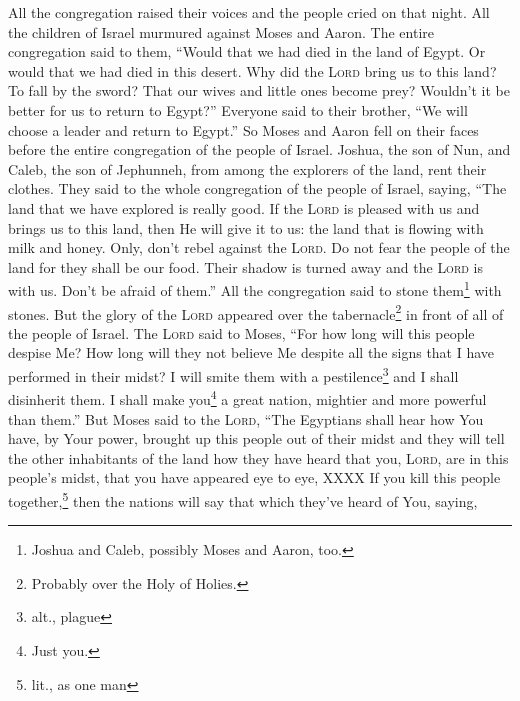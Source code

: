 

\begin{enumerate*}[mode=unboxed]
     All the congregation raised their voices and the people cried on that night.%
     All the children of Israel murmured against Moses and Aaron. The entire congregation said to them, ``Would that we had died in the land of Egypt. Or would that we had died in this desert.%
     Why did the \textsc{Lord} bring us to this land? To fall by the sword? That our wives and little ones become prey? Wouldn't it be better for us to return to Egypt?''%
     Everyone said to their brother, ``We will choose a leader and return to Egypt.''%
     So Moses and Aaron fell on their faces before the entire congregation of the people of Israel.%
     Joshua, the son of Nun, and Caleb, the son of Jephunneh, from among the explorers of the land, rent their clothes.%
     They said to the whole congregation of the people of Israel, saying, ``The land that we have explored is really good.%
     If the \textsc{Lord} is pleased with us and brings us to this land, then He will give it to us: the land that is flowing with milk and honey.%
     Only, don't rebel against the \textsc{Lord}. Do not fear the people of the land for they shall be our food. Their shadow is turned away and the \textsc{Lord} is with us. Don't be afraid of them.''%
     All the congregation said to stone them\footnote{Joshua and Caleb, possibly Moses and Aaron, too.} with stones. But the glory of the \textsc{Lord} appeared over the tabernacle\footnote{Probably over the Holy of Holies.} in front of all of the people of Israel.%
     The \textsc{Lord} said to Moses, ``For how long will this people despise Me? How long will they not believe Me despite all the signs that I have performed in their midst?%
     I will smite them with a pestilence\footnote{alt., plague} and I shall disinherit them. I shall make you\footnote{Just you.} a great nation, mightier and more powerful than them.''%
     But Moses said to the \textsc{Lord}, ``The Egyptians shall hear how You have, by Your power, brought up this people out of their midst%
     and they will tell the other inhabitants of the land how they have heard that you, \textsc{Lord}, are in this people's midst, that you have appeared eye to eye, XXXX%
     If you kill this people together,\footnote{lit., as one man} then the nations will say that which they've heard of You, saying,%

\end{enumerate*}
